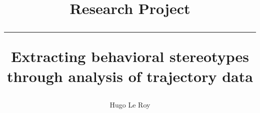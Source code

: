 \documentclass[a4paper,10pt]{article}
\title{Research Project \\ \rule{\textwidth}{0.5pt} Extracting behavioral stereotypes through analysis of trajectory data}
\author{Hugo Le Roy}
\date{}
\begin{document}
\maketitle
\begin{abstract}

\end{abstract}




%

\clearpage
\pagestyle{empty}


%
\label{sec:textend}
\end{document}
